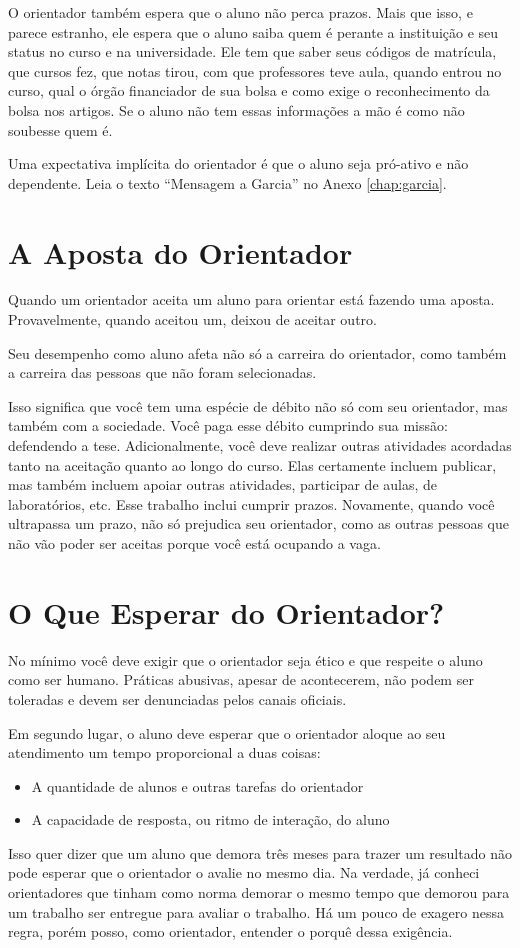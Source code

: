 O orientador também espera que o aluno não perca prazos. Mais que isso, e parece estranho, ele espera que o aluno saiba quem é perante a instituição e seu status no curso e na universidade. Ele tem que saber seus códigos de matrícula, que cursos fez, que notas tirou, com que professores teve aula, quando entrou no curso, qual o órgão financiador de sua bolsa e como exige o reconhecimento da bolsa nos artigos. Se o aluno não tem essas informações a mão é como não soubesse quem é.

Uma expectativa implícita do orientador é que o aluno seja pró-ativo e não dependente. Leia o texto ``Mensagem a Garcia'' no Anexo \ref{chap:garcia}.

\section{A Aposta do Orientador}

Quando um orientador aceita um aluno para orientar está fazendo uma aposta. Provavelmente, quando aceitou um, deixou de aceitar outro.

Seu desempenho como aluno afeta não só a carreira do orientador, como também a carreira das pessoas que não foram selecionadas.

Isso significa que você tem uma espécie de débito não só com seu orientador, mas também com a sociedade. Você paga esse débito cumprindo sua missão: defendendo a tese. Adicionalmente, você deve realizar outras atividades acordadas tanto na aceitação quanto ao longo do curso. Elas certamente incluem publicar, mas também incluem apoiar outras atividades, participar de aulas, de laboratórios, etc. Esse trabalho inclui cumprir prazos. Novamente, quando você ultrapassa um prazo, não só prejudica seu orientador, como as outras pessoas que não vão poder ser aceitas porque você está ocupando a vaga.


\section{O Que Esperar do Orientador?}

No mínimo você deve exigir que o orientador seja ético e que respeite o aluno como ser humano. Práticas abusivas, apesar de acontecerem, não podem ser toleradas e devem ser denunciadas pelos canais oficiais.

Em segundo lugar, o aluno deve esperar que o orientador aloque ao seu atendimento um tempo proporcional a duas coisas:
\begin{itemize}
    \item A quantidade de alunos e outras tarefas do orientador
    \item A capacidade de resposta, ou ritmo de interação, do aluno
\end{itemize}
Isso quer dizer que um aluno que demora três meses para trazer um resultado não pode esperar que o orientador o avalie no mesmo dia. Na verdade, já conheci orientadores que tinham como norma demorar o mesmo tempo que demorou para um trabalho ser entregue para avaliar o trabalho. Há um pouco de exagero nessa regra, porém posso, como orientador, entender o porquê dessa exigência.

